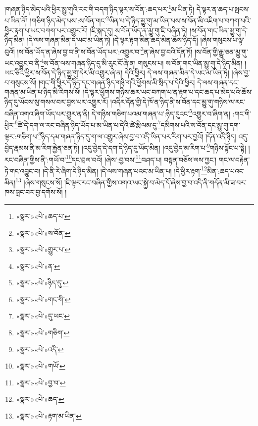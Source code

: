 །གཞན་ཉིད་མེད་པའི་ཕྱིར་མྱུ་གུའི་རང་གི་བདག་ཉིད་ལྟར་ས་བོན་:ཆད་པར་\footnote{«སྣར་»«པེ་»ཆད་པ་}མ་ཡིན་ཏེ། དེ་ལྟར་ན་ཆད་པ་སྤངས་པ་ཡིན་ནོ། །གཅིག་ཉིད་མེད་པས་:ས་བོན་གང་\footnote{«སྣར་»«པེ་»ས་བོན་}ཡིན་པ་དེ་ཉིད་མྱུ་གུ་མ་ཡིན་པས་ས་བོན་མི་འཇིག་པ་བཀག་པའི་ཕྱིར་རྟག་པ་ཡང་བཀག་པར་འགྱུར་རོ། །ཇི་སྐད་དུ། ས་བོན་ཡོད་ན་མྱུ་གུ་ཇི་བཞིན་ཏེ། །ས་བོན་གང་ཡིན་མྱུ་གུ་དེ་ཉིད་མིན། །དེ་ལས་གཞན་མིན་དེ་ཡང་མ་ཡིན་ཏེ། །དེ་ལྟར་རྟག་མིན་ཆད་མིན་ཆོས་ཉིད་དོ། །ཞེས་གསུངས་པ་ལྟ་བུའོ། །ས་བོན་ཡོད་ན་ཞེས་བྱ་བ་ནི་ས་བོན་ཡོད་པར་:འགྱུར་བ་\footnote{«སྣར་»«པེ་»གྱུར་པ་}ན་ཞེས་བྱ་བའི་དོན་ཏོ། །ས་བོན་གྱི་རྒྱུ་ཅན་མྱུ་གུ་ཡང་འབྱུང་བ་ནི་\footnote{«སྣར་»«པེ་»ན་}ས་བོན་ལས་གཞན་ཉིད་དུ་མི་རུང་ངོ་ཞེ་ན། གསུངས་པ། ས་བོན་གང་ཡིན་མྱུ་གུ་དེ་ཉིད་མིན། །ཡང་ཅིའི་ཕྱིར་ས་བོན་དེ་ཉིད་མྱུ་གུ་དེར་མི་འགྱུར་ཞེ་ན། དེའི་ཕྱིར། དེ་ལས་གཞན་མིན་དེ་ཡང་མ་ཡིན་ཏེ། །ཞེས་བྱ་བ་གསུངས་སོ། །གང་གི་ཕྱིར་དེ་ཉིད་དང་གཞན་ཉིད་གཉི་གའི་ཕྱོགས་མི་སྲིད་པ་དེའི་ཕྱིར། དེ་ལས་གཞན་དང་གཞན་མ་ཡིན་པ་ཉིད་མི་རིགས་སོ། །དེ་ལྟར་ཕྱོགས་གཉིས་ཆར་ཡང་བཀག་པ་ན་རྟག་པ་དང་ཆད་པ་མེད་པའི་ཆོས་ཉིད་དུ་ཡོངས་སུ་གསལ་བར་བྱས་པར་འགྱུར་རོ། །འདིར་དོན་གྱི་དེ་ཁོ་ན་ཉིད་ནི་ས་བོན་དང་མྱུ་གུ་གཉིས་ལ་རང་བཞིན་འགའ་ཞིག་ཡོད་པར་གྱུར་ན་ནི། དེ་གཉིས་གཅིག་པའམ་གཞན་པ་:ཉིད་དུའང་\footnote{«སྣར་»«པེ་»ཉིད་དུ་}འགྱུར་བ་ཞིག་ན། :གང་གི་ཕྱིར་\footnote{«སྣར་»«པེ་»གང་གི་}ཚེ་དེ་དག་ལ་རང་བཞིན་ཉིད་ཡོད་པ་མ་ཡིན་པ་དེའི་ཚེ་རྨི་ལམ་དུ་\footnote{«སྣར་»«པེ་»དུ་ཡང་}དམིགས་པའི་ས་བོན་དང་མྱུ་གུ་དག་ལྟར་:གཅིག་པ་\footnote{«སྣར་»«པེ་»གཅིག་}ཉིད་དམ་གཞན་ཉིད་དུ་ག་ལ་འགྱུར་ཞེས་བྱ་བ་འདི་ཡིན་པར་རིག་པར་བྱའོ། །དོན་འདི་ཉིད། འདུ་བྱེད་རྣམས་ནི་མ་རིག་རྐྱེན་ཅན་ཏེ། །འདུ་བྱེད་དེ་དག་དེ་ཉིད་དུ་ཡོད་མིན། །འདུ་བྱེད་མ་རིག་པ་\footnote{«སྣར་»«པེ་»འདི་}གཉིས་སྟོང་པ་སྟེ། །རང་བཞིན་གྱིས་ནི་:གཡོ་བ་\footnote{«སྣར་»«པེ་»གཡོ་}དང་བྲལ་བའོ། །ཞེས་:བྱ་བས་\footnote{«སྣར་»«པེ་»བྱ་བ་}བཤད་པ། བསྟན་བཅོས་ལས་ཀྱང་། གང་ལ་བརྟེན་ཏེ་གང་འབྱུང་བ། །དེ་ནི་རེ་ཞིག་དེ་ཉིད་མིན། །དེ་ལས་གཞན་པའང་མ་ཡིན་པ། །དེ་ཕྱིར་རྟག་\footnote{«སྣར་»«པེ་»ཆད་}མིན་:ཆད་པའང་མིན།\footnote{«སྣར་»«པེ་»རྟག་མ་ཡིན།} །ཞེས་གསུངས་སོ། །ཇི་ལྟར་རང་བཞིན་གྱིས་འགའ་ཡང་སྐྱེ་བ་མེད་དོ་ཞེས་བྱ་བ་འདི་ནི་གདོན་མི་ཟ་བར་ཁས་བླང་བར་བྱ་དགོས་སོ། །
